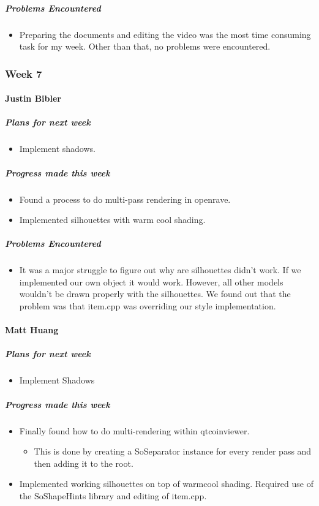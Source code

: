 {\subparagraph{Problems Encountered}
\begin{itemize}
  \item Preparing the documents and editing the video was the most time consuming task for my week. Other than that, no problems were encountered.
\end{itemize}

}

\newpage

{
\subsubsection{Week 7}
\paragraph{Justin Bibler}
\subparagraph{Plans for next week}
\begin{itemize}
  \item Implement shadows.
\end{itemize}

\subparagraph{Progress made this week}
\begin{itemize}
  \item Found a process to do multi-pass rendering in openrave.
  \item Implemented silhouettes with warm cool shading.
\end{itemize}

\subparagraph{Problems Encountered}
\begin{itemize}
  \item It was a major struggle to figure out why are silhouettes didn't work. If we implemented our own object it would work. However, all other models wouldn't be drawn properly with the silhouettes. We found out that the problem was that item.cpp was overriding our style implementation.
\end{itemize}
\vspace{3mm}

\paragraph{Matt Huang}
\subparagraph{Plans for next week}
\begin{itemize}
  \item Implement Shadows
\end{itemize}

\subparagraph{Progress made this week}
\begin{itemize}
  \item Finally found how to do multi-rendering within qtcoinviewer.
  \begin{itemize}
    \item This is done by creating a SoSeparator instance for every render pass and then adding it to the root.
  \end{itemize}
  \item Implemented working silhouettes on top of warmcool shading. Required use of the SoShapeHints library and editing of item.cpp.
\end{itemize}

}
